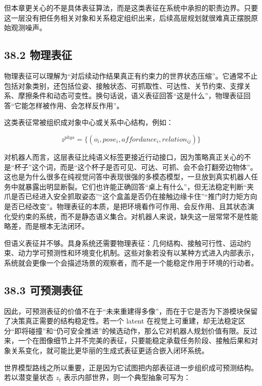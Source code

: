 但本章更关心的不是具体表征算法，而是这类表征在系统中承担的职责边界。只要这一层没有把任务相关对象和关系稳定组织出来，后续高层规划就很难真正摆脱原始观测噪声。

\subsection*{38.2 物理表征}


物理表征可以理解为“对后续动作结果真正有约束力的世界状态压缩”。它通常不止包括对象类别，还包括位姿、接触状态、可抓取性、可达性、关节约束、支撑关系、摩擦条件和动态可变性。换句话说，语义表征回答“这是什么”，物理表征回答“它能怎样被作用、会怎样反作用”。

这类表征常被组织成对象中心或关系中心结构，例如：

\begingroup
\footnotesize
\begin{equation*}
z^{phys} = \{(o_i, pose_i, affordance_i, relation_{ij})\}
\end{equation*}
\endgroup

对机器人而言，这层表征比纯语义标签更接近行动接口，因为策略真正关心的不是“杯子”这个词，而是“这个杯子是否可见、可达、可抓、会不会打翻旁边物体”。 这也是为什么很多在纯视觉问答中表现很强的多模态模型，一旦放到真实机器人任务中就暴露出明显断裂。它们也许能正确回答“桌上有什么”，但无法稳定判断“夹爪是否已经进入安全抓取姿态”“这个盒盖是否仍在接触边缘卡住”“推门时力矩方向是否已经改变”。物理表征的本质，是把环境看作可作用、会反作用、且其状态演化受约束的系统，而不是静态语义集合。对机器人来说，缺失这一层常常不是性能略差，而是根本无法闭环。

但语义表征并不够。具身系统还需要物理表征：几何结构、接触可行性、运动约束、动力学可预测性和环境变化机制。这些对象若没有以某种方式进入内部表示，系统就会更像一个会描述场景的观察者，而不是一个能稳定作用于环境的行动者。

\subsection*{38.3 可预测表征}


因此，可预测表征的价值不在于“未来重建得多像”，而在于它是否为下游模块保留了决策真正需要的结构稳定性。若一个 latent 在视觉上可重建，却无法稳定区分“即将碰撞”和“仍可安全推进”的候选动作，那么它对机器人规划价值有限。反过来，一个在图像细节上并不完美的表征，只要能稳定承载任务阶段、接触后果和对象关系变化，就可能比更华丽的生成式表征更适合嵌入闭环系统。

世界模型路线之所以重要，正是因为它试图把内部表征进一步组织成可预测结构。若以潜变量状态 \(z_t\) 表示内部世界，则一个典型抽象可写为：

